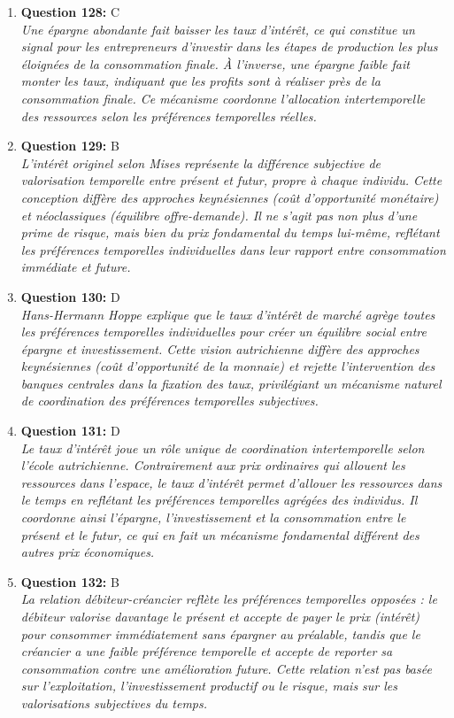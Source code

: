 \documentclass[12pt,a4paper]{article}
\begin{document}
\begin{enumerate}
\item \textbf{Question 128:} C
\\ \textit{Une épargne abondante fait baisser les taux d'intérêt, ce qui constitue un signal pour les entrepreneurs d'investir dans les étapes de production les plus éloignées de la consommation finale. À l'inverse, une épargne faible fait monter les taux, indiquant que les profits sont à réaliser près de la consommation finale. Ce mécanisme coordonne l'allocation intertemporelle des ressources selon les préférences temporelles réelles.}

\item \textbf{Question 129:} B
\\ \textit{L'intérêt originel selon Mises représente la différence subjective de valorisation temporelle entre présent et futur, propre à chaque individu. Cette conception diffère des approches keynésiennes (coût d'opportunité monétaire) et néoclassiques (équilibre offre-demande). Il ne s'agit pas non plus d'une prime de risque, mais bien du prix fondamental du temps lui-même, reflétant les préférences temporelles individuelles dans leur rapport entre consommation immédiate et future.}

\item \textbf{Question 130:} D
\\ \textit{Hans-Hermann Hoppe explique que le taux d'intérêt de marché agrège toutes les préférences temporelles individuelles pour créer un équilibre social entre épargne et investissement. Cette vision autrichienne diffère des approches keynésiennes (coût d'opportunité de la monnaie) et rejette l'intervention des banques centrales dans la fixation des taux, privilégiant un mécanisme naturel de coordination des préférences temporelles subjectives.}

\item \textbf{Question 131:} D
\\ \textit{Le taux d'intérêt joue un rôle unique de coordination intertemporelle selon l'école autrichienne. Contrairement aux prix ordinaires qui allouent les ressources dans l'espace, le taux d'intérêt permet d'allouer les ressources dans le temps en reflétant les préférences temporelles agrégées des individus. Il coordonne ainsi l'épargne, l'investissement et la consommation entre le présent et le futur, ce qui en fait un mécanisme fondamental différent des autres prix économiques.}

\item \textbf{Question 132:} B
\\ \textit{La relation débiteur-créancier reflète les préférences temporelles opposées : le débiteur valorise davantage le présent et accepte de payer le prix (intérêt) pour consommer immédiatement sans épargner au préalable, tandis que le créancier a une faible préférence temporelle et accepte de reporter sa consommation contre une amélioration future. Cette relation n'est pas basée sur l'exploitation, l'investissement productif ou le risque, mais sur les valorisations subjectives du temps.}


\end{enumerate}
\end{document}
